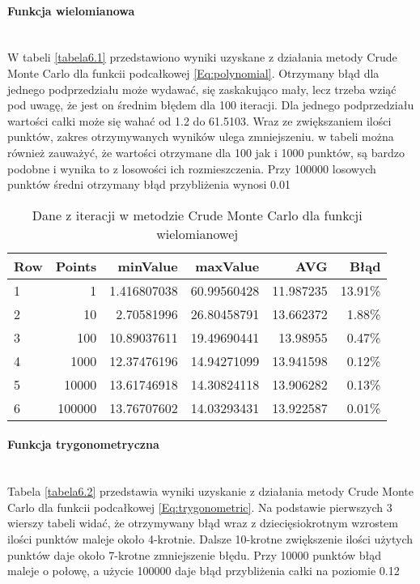 \documentclass[12pt,twoside]{article}
\begin{document}
\paragraph{Funkcja wielomianowa}\mbox{} \\

W tabeli \eqref{tabela6.1} przedstawiono wyniki uzyskane z działania metody Crude Monte Carlo dla funkcii podcałkowej \eqref{Eq:polynomial}.
Otrzymany błąd dla jednego podprzedziału może wydawać, się zaskakująco mały, lecz trzeba wziąć pod uwagę, że jest on średnim błędem dla 100 iteracji. Dla jednego podprzedziału wartości całki może się wahać od 1.2 do 61.5103. Wraz ze zwiększaniem ilości punktów, zakres otrzymywanych wyników ulega zmniejszeniu. w tabeli można również zauważyć, że wartości otrzymane dla 100 jak i 1000 punktów, są bardzo podobne i wynika to z losowości ich rozmieszczenia.
Przy 100000 losowych punktów średni otrzymany błąd przybliżenia wynosi 0.01%


\begin{table}[H]
\centering 
\caption{Dane z iteracji w metodzie Crude Monte Carlo dla funkcji wielomianowej}
\label{tabela6.1}
\begin{tabular}{lrrrrr}
\toprule
{Row} &  Points &  minValue &  maxValue &       AVG &      Błąd \\
\midrule
1  &     1 & 1.416807038 &   60.99560428 & 11.987235 & 13.91\% \\
2  &     10 & 2.70581996 &   26.80458791 & 13.662372 & 1.88\% \\
3  &     100 & 10.89037611 &  19.49690441 & 13.98955& 0.47\% \\
4  &     1000 & 12.37476196 &   14.94271099 & 13.941598 & 0.12\% \\
5  &     10000 & 13.61746918 &  14.30824118 & 13.906282 & 0.13\% \\
6  &     100000 & 13.76707602 &  14.03293431 & 13.922587 & 0.01\% \\
\bottomrule
\end{tabular}
\end{table}


\paragraph{Funkcja trygonometryczna}\mbox{} \\

Tabela \eqref{tabela6.2} przedstawia wyniki uzyskanie z działania metody Crude Monte Carlo dla funkcii podcałkowej \eqref{Eq:trygonometric}.
Na podstawie pierwszych 3 wierszy tabeli widać, że otrzymywany błąd wraz z dziecięsiokrotnym wzrostem ilości punktów maleje około 4-krotnie.
Dalsze 10-krotne zwiększenie ilości użytych punktów  daje około 7-krotne zmniejszenie błędu. Przy 10000 punktów błąd maleje o połowę, a użycie 100000 daje błąd przybliżenia całki na poziomie 0.12%
\end{document}
